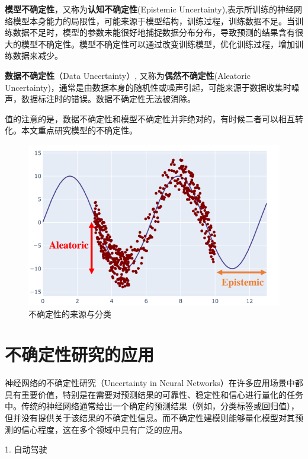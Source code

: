 \textbf{模型不确定性}，又称为\textbf{认知不确定性}(Epistemic Uncertainty),表示所训练的神经网络模型本身能力的局限性，可能来源于模型结构，训练过程，训练数据不足。当训练数据不足时，模型的参数未能很好地捕捉数据分布分布，导致预测的结果含有很大的模型不确定性。模型不确定性可以通过改变训练模型，优化训练过程，增加训练数据来减少。

\textbf{数据不确定性}（Data Uncertainty）, 又称为\textbf{偶然不确定性}(Aleatoric Uncertainty)，通常是由数据本身的随机性或噪声引起，可能来源于数据收集时噪声，数据标注时的错误。数据不确定性无法被消除。

值的注意的是，数据不确定性和模型不确定性并非绝对的，有时候二者可以相互转化\cite{hullermeier2021aleatoric}。本文重点研究模型的不确定性。

\begin{figure}[H]
    \centering
    \includegraphics[width=0.75\linewidth]{assets/1-1.png}
    \caption{不确定性的来源与分类\cite{abdar2021review}
}
    \label{fig:enter-label}
\end{figure}

\section{不确定性研究的应用}
神经网络的不确定性研究（Uncertainty in Neural Networks）在许多应用场景中都具有重要价值，特别是在需要对预测结果的可靠性、稳定性和信心进行量化的任务中。传统的神经网络通常给出一个确定的预测结果（例如，分类标签或回归值），但并没有提供关于该结果的不确定性信息。而不确定性建模则能够量化模型对其预测的信心程度，这在多个领域中具有广泛的应用。

1. 自动驾驶

